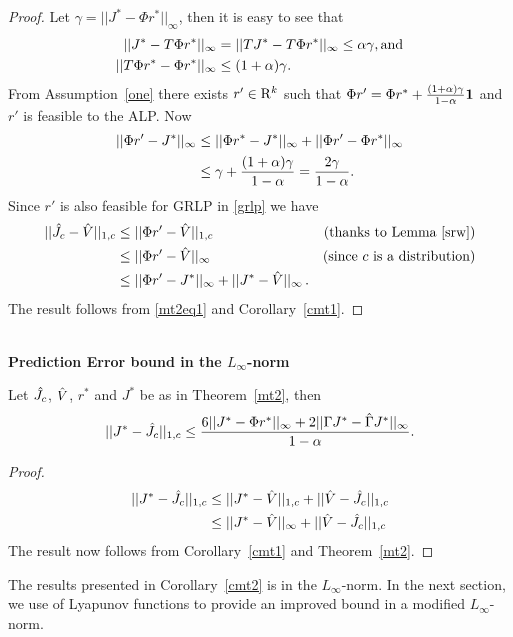 \begin{proof}
Let $\gamma=||J^*-\Phi r^*||_\infty$, then  it is easy to see that
\begin{align}
||J^*-T\Phi r^*||_\infty&=||TJ^*-T\Phi r^*||_\infty\leq\alpha\gamma,\relax{ }\text{and}\nonumber\\
||T\Phi r^*-\Phi r^*||_\infty&\leq(1+\alpha)\gamma.
\end{align}
From Assumption~\ref{one} there exists $r'\in \mathrm{R}^k$ such that $\Phi r'=\Phi r^*+\frac{(1+\alpha)\gamma}{1-\alpha}\mathbf{1}$ and $r'$ is feasible to the ALP. 
Now
\begin{align}
||\Phi r'-J^*||_\infty&\leq ||\Phi r^* -J^*||_\infty+||\Phi r'-\Phi r^*||_\infty\nn\\&\leq \gamma+\frac{(1+\alpha)\gamma}{1-\alpha}=\frac{2\gamma}{1-\alpha}.
\label{mt2eq1}
\end{align}
Since $r'$ is also feasible for GRLP in \eqref{grlp} we have
\begin{align}
||\hj-\hv||_{1,c}&\leq||\Phi r'-\hv||_{1,c}\nn &(\text{thanks to Lemma~\ref{srw}}) \\ %
&\leq||\Phi r'-\hv||_\infty\mb & (\text{since $c$ is a distribution})\nn\\
&\leq||\Phi r'-J^*||_\infty+||J^*-\hv||_\infty\,.\nn
\end{align}
The result follows from \eqref{mt2eq1} and Corollary~\ref{cmt1}.
\end{proof}\\
\textbf{Prediction Error bound in the $L_\infty$-norm}\\
\begin{corollary}\label{cmt2}
Let $\hat{J}_c$, $\hat{V}$, $r^*$ and $J^*$ be as in Theorem~\ref{mt2}, then 
\begin{align}\label{finalbnd}
||J^*-\hj||_{1,c}\leq\frac{6 ||J^*-\Phi r^*||_\infty+2||\Gamma J^*-\hg J^*||_\infty}{1-\alpha}.
\end{align}
\end{corollary}
\begin{proof}
\begin{align}
||J^*-\hat{J}_c||_{1,c}&\leq||J^*-\hat{V}||_{1,c}+||\hat{V}-\hat{J}_c||_{1,c}\nonumber\\
&\leq||J^*-\hat{V}||_\infty+||\hat{V}-\hat{J}_c||_{1,c}\nonumber
\end{align}
The result now follows from Corollary~\ref{cmt1} and Theorem~\ref{mt2}.
\end{proof}
The results presented in Corollary~\ref{cmt2} is in the $L_\infty$-norm. In the next section, we use of Lyapunov functions to provide an improved bound in a modified $L_\infty$-norm.
